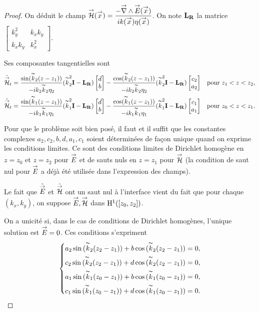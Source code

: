 \begin{proof}
      On déduit le champ \(\vH(\vx) = \frac{-\vrot{\vE}(\vx)}{i k(\vx)\eta(\vx)}\). 
      On note \(\mLR\) la matrice \(
      \begin{bmatrix}
          k_y^2 & k_xk_y
          \\
          k_xk_y & k_x^2
      \end{bmatrix}
      \).


      Ses composantes tangentielles sont
      \begin{align*}
        \hat{\vH}_t &= \frac{\sin(\kk_2(z-z_1))}{-i k_2\kk_2 \eta_2}(\kk_2^2 \mI - \mLR)\begin{bmatrix}d \\ b\end{bmatrix} - \frac{\cos(\kk_2(z-z_1))}{-i k_2\kk_2 \eta_2}(\kk_2^2 \mI - \mLR)\begin{bmatrix}c_2 \\ a_2\end{bmatrix} && \text{pour } z_1 < z < z_2,
        \\
        \hat{\vH}_t &= \frac{\sin(\kk_1(z-z_1))}{-i k_1\kk_1 \eta_1}(\kk_1^2 \mI - \mLR)\begin{bmatrix}d \\ b\end{bmatrix} - \frac{\cos(\kk_1(z-z_1))}{-i k_1\kk_1 \eta_1}(\kk_1^2 \mI - \mLR)\begin{bmatrix}c_1 \\ a_1\end{bmatrix} && \text{pour } z_0 < z < z_1.
      \end{align*}

      Pour que le problème soit bien posé, il faut et il suffit que les constantes complexes \(a_2,c_2,b,d,a_1,c_1\) soient déterminées de façon unique quand on exprime les conditions limites. Ce sont des conditions limites de Dirichlet homogène en \(z=z_0\) et \(z=z_2\) pour \(\vE\) et de sauts nuls en \(z=z_1\) pour \(\vH\) (la condition de saut nul pour \(\vE\) a déjà été utilisée dans l'expression des champs).
      \begin{REM}
        Le fait que \(\hat{\vE}\) et \(\hat{\vH}\) ont un saut nul à l'interface vient du fait que pour chaque \((k_x,k_y)\), on suppose \(\vE,\vH\) dans \(\Sobup[1]{([z_0,z_2])}\).
      \end{REM}
      On a unicité si, dans le cas de conditions de Dirichlet homogènes, l'unique solution est \(\vE=0\). Ces conditions s'expriment
      \begin{equation*}
        \label{eq:unicite:interieur:2couches:cldirichlet}
        \left\lbrace
        \begin{aligned}
          a_2\sin{(\kk_2(z_2-z_1))} + b\cos{(\kk_2(z_2-z_1))} &= 0,
          \\
          c_2\sin{(\kk_2(z_2-z_1))} + d\cos{(\kk_2(z_2-z_1))} &= 0,
          \\
          a_1\sin{(\kk_1(z_0-z_1))} + b\cos{(\kk_1(z_0-z_1))} &= 0,
          \\
          c_1\sin{(\kk_1(z_0-z_1))} + d\cos{(\kk_1(z_0-z_1))} &= 0.
        \end{aligned}
        \right.
      \end{equation*}


\end{proof}

